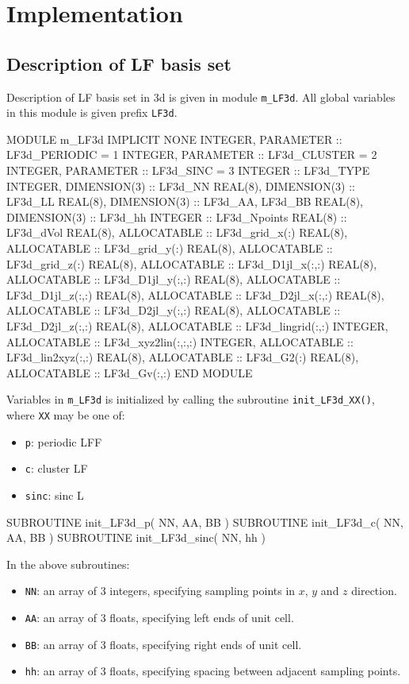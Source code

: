 \section{Implementation}

\subsection{Description of LF basis set}

Description of LF basis set in 3d is given in module
{\tt m\_LF3d}. All global variables in this module is given
prefix {\tt LF3d}.

\begin{fortrancode}
MODULE m_LF3d
  IMPLICIT NONE
  INTEGER, PARAMETER :: LF3d_PERIODIC = 1
  INTEGER, PARAMETER :: LF3d_CLUSTER  = 2
  INTEGER, PARAMETER :: LF3d_SINC     = 3
  INTEGER :: LF3d_TYPE
  INTEGER, DIMENSION(3) :: LF3d_NN
  REAL(8), DIMENSION(3) :: LF3d_LL
  REAL(8), DIMENSION(3) :: LF3d_AA, LF3d_BB
  REAL(8), DIMENSION(3) :: LF3d_hh
  INTEGER :: LF3d_Npoints
  REAL(8) :: LF3d_dVol
  REAL(8), ALLOCATABLE :: LF3d_grid_x(:)
  REAL(8), ALLOCATABLE :: LF3d_grid_y(:)
  REAL(8), ALLOCATABLE :: LF3d_grid_z(:)
  REAL(8), ALLOCATABLE :: LF3d_D1jl_x(:,:)
  REAL(8), ALLOCATABLE :: LF3d_D1jl_y(:,:)
  REAL(8), ALLOCATABLE :: LF3d_D1jl_z(:,:)
  REAL(8), ALLOCATABLE :: LF3d_D2jl_x(:,:)
  REAL(8), ALLOCATABLE :: LF3d_D2jl_y(:,:)
  REAL(8), ALLOCATABLE :: LF3d_D2jl_z(:,:)
  REAL(8), ALLOCATABLE :: LF3d_lingrid(:,:)
  INTEGER, ALLOCATABLE :: LF3d_xyz2lin(:,:,:)
  INTEGER, ALLOCATABLE :: LF3d_lin2xyz(:,:)
  REAL(8), ALLOCATABLE :: LF3d_G2(:)
  REAL(8), ALLOCATABLE :: LF3d_Gv(:,:)
END MODULE
\end{fortrancode}

Variables in {\tt m\_LF3d} is initialized by calling the subroutine
{\tt init\_LF3d\_XX()}, where {\tt XX} may be one of:
\begin{itemize}
\item {\tt p}: periodic LFF
\item {\tt c}: cluster LF
\item {\tt sinc}: sinc L
\end{itemize}

\begin{fortrancode}
SUBROUTINE init_LF3d_p( NN, AA, BB )
SUBROUTINE init_LF3d_c( NN, AA, BB )
SUBROUTINE init_LF3d_sinc( NN, hh )
\end{fortrancode}

In the above subroutines:
\begin{itemize}
\item {\tt NN}: an array of 3 integers, specifying sampling points in $x$,
$y$ and $z$ direction.
\item {\tt AA}: an array of 3 floats, specifying left ends of unit cell.
\item {\tt BB}: an array of 3 floats, specifying right ends of unit cell.
\item {\tt hh}: an array of 3 floats, specifying spacing between adjacent sampling points.
\end{itemize}

